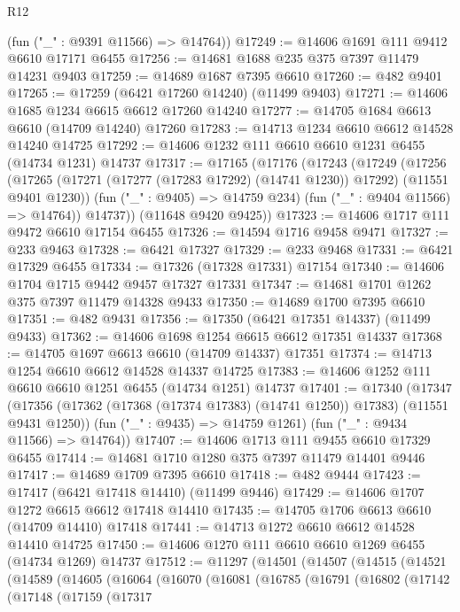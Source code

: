 \begin{lexlean}{R12}
\begin{coremodule}
      (fun ("_" : @9391 @11566) => @14764))
@17249 := @14606 @1691 @111 @9412 @6610 @17171 @6455
@17256 := @14681 @1688 @235 @375 @7397 @11479 @14231 @9403
@17259 := @14689 @1687 @7395 @6610
@17260 := @482 @9401
@17265 := @17259 (@6421 @17260 @14240) (@11499 @9403)
@17271 := @14606 @1685 @1234 @6615 @6612 @17260 @14240
@17277 := @14705 @1684 @6613 @6610 (@14709 @14240) @17260
@17283 := @14713 @1234 @6610 @6612 @14528 @14240 @14725
@17292 := @14606 @1232 @111 @6610 @6610 @1231 @6455 (@14734 @1231) @14737
@17317 := @17165
    (@17176
      (@17243
        (@17249
          (@17256
            (@17265 (@17271 (@17277 (@17283 @17292) (@14741 @1230)) @17292) (@11551 @9401 @1230))
            (fun ("_" : @9405) => @14759 @234)
            (fun ("_" : @9404 @11566) => @14764))
          @14737))
      (@11648 @9420 @9425))
@17323 := @14606 @1717 @111 @9472 @6610 @17154 @6455
@17326 := @14594 @1716 @9458 @9471
@17327 := @233 @9463
@17328 := @6421 @17327
@17329 := @233 @9468
@17331 := @6421 @17329 @6455
@17334 := @17326 (@17328 @17331) @17154
@17340 := @14606 @1704 @1715 @9442 @9457 @17327 @17331
@17347 := @14681 @1701 @1262 @375 @7397 @11479 @14328 @9433
@17350 := @14689 @1700 @7395 @6610
@17351 := @482 @9431
@17356 := @17350 (@6421 @17351 @14337) (@11499 @9433)
@17362 := @14606 @1698 @1254 @6615 @6612 @17351 @14337
@17368 := @14705 @1697 @6613 @6610 (@14709 @14337) @17351
@17374 := @14713 @1254 @6610 @6612 @14528 @14337 @14725
@17383 := @14606 @1252 @111 @6610 @6610 @1251 @6455 (@14734 @1251) @14737
@17401 := @17340
    (@17347
      (@17356 (@17362 (@17368 (@17374 @17383) (@14741 @1250)) @17383) (@11551 @9431 @1250))
      (fun ("_" : @9435) => @14759 @1261)
      (fun ("_" : @9434 @11566) => @14764))
@17407 := @14606 @1713 @111 @9455 @6610 @17329 @6455
@17414 := @14681 @1710 @1280 @375 @7397 @11479 @14401 @9446
@17417 := @14689 @1709 @7395 @6610
@17418 := @482 @9444
@17423 := @17417 (@6421 @17418 @14410) (@11499 @9446)
@17429 := @14606 @1707 @1272 @6615 @6612 @17418 @14410
@17435 := @14705 @1706 @6613 @6610 (@14709 @14410) @17418
@17441 := @14713 @1272 @6610 @6612 @14528 @14410 @14725
@17450 := @14606 @1270 @111 @6610 @6610 @1269 @6455 (@14734 @1269) @14737
@17512 := @11297
    (@14501
      (@14507
        (@14515
          (@14521
            (@14589
              (@14605
                (@16064
                  (@16070
                    (@16081
                      (@16785
                        (@16791
                          (@16802
                            (@17142
                              (@17148
                                (@17159
                                  (@17317

\end{coremodule}
\end{lexlean}
